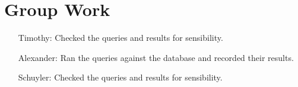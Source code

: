 \documentclass[american,extrafontsizes,12pt,portrait,letterpaper,oneside,onecolumn,article,final]{memoir}
\begin{document}
\section*{Group Work}
%
\begin{samepage}%
\begin{enumerate}[leftmargin=*,widest={Alexander:}]

\item[Timothy:]
%
Checked the queries and results for sensibility.

\item[Alexander:]
%
Ran the queries against the database and recorded their results.

\item[Schuyler:]
%
Checked the queries and results for sensibility.

\end{enumerate}%
\end{samepage}
\end{document}

